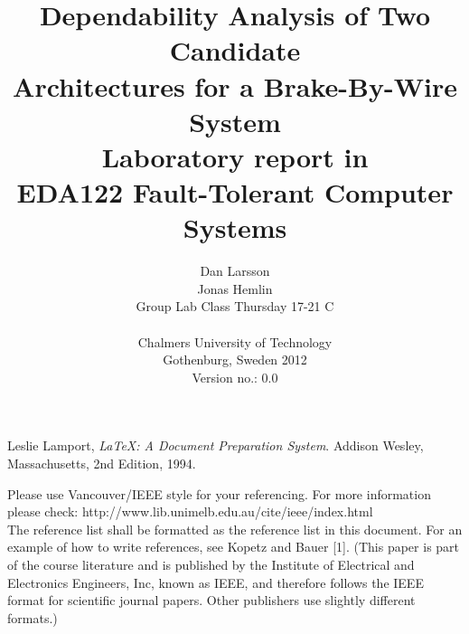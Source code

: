 \documentclass{article}
\title{Dependability Analysis of Two Candidate\\ Architectures for a Brake-By-Wire System \\
\vspace{2.0cm}
\small Laboratory report in \\ EDA122 Fault-Tolerant Computer Systems \\[5ex]} %
\author{Dan Larsson\\ Jonas Hemlin\\ \small Group Lab Class Thursday 17-21 C\\
\vspace{5.0cm}
\\ \small Chalmers University of Technology \\
\small Gothenburg, Sweden 2012\\
\small Version no.: 0.0\\
} %
\begin{document}
\maketitle %
%
%
\newpage
\tableofcontents








\begin{thebibliography}{9}
  Leslie Lamport,
  \emph{\LaTeX: A Document Preparation System}.
  Addison Wesley, Massachusetts,
  2nd Edition,
  1994.

Please use Vancouver/IEEE style for your referencing. For more information please check: http://www.lib.unimelb.edu.au/cite/ieee/index.html
\\
The reference list shall be formatted as the reference list in this document. For an example of how to write references, see Kopetz and Bauer [1]. (This paper is part of the course literature and is published by the Institute of Electrical and Electronics Engineers, Inc, known as IEEE, and therefore follows the IEEE format for scientific journal papers. Other publishers use slightly different formats.)

\end{thebibliography}
\end{document}
